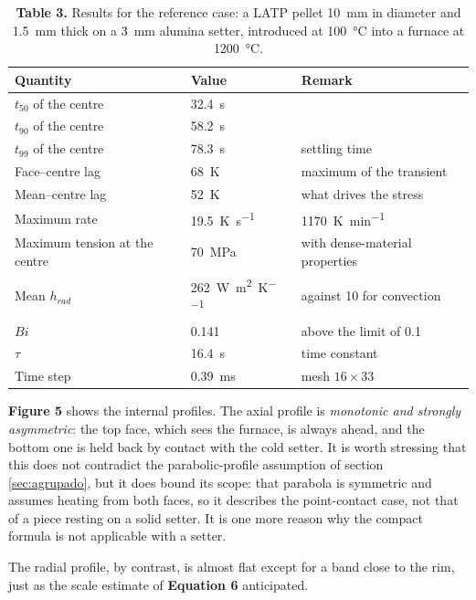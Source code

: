 \documentclass[11pt,a4paper]{article}
\newcommand{\fig}[1]{\textbf{\textcolor{uji}{Figure #1}}}
\newcommand{\ecu}[1]{\textbf{\textcolor{uji}{Equation #1}}}
\begin{document}
\begin{table}[htbp]
\centering
\caption*{\textcolor{uji}{\textbf{Table 3.}} Results for the reference
case: a LATP pellet \SI{10}{\milli\meter} in diameter and
\SI{1.5}{\milli\meter} thick on a \SI{3}{\milli\meter} alumina setter,
introduced at \SI{100}{\celsius} into a furnace at \SI{1200}{\celsius}.}
\begin{tabular}{lll}
\toprule
Quantity & Value & Remark \\
\midrule
$t_{50}$ of the centre & \SI{32.4}{\second} & \\
$t_{90}$ of the centre & \SI{58.2}{\second} & \\
$t_{99}$ of the centre & \SI{78.3}{\second} & settling time \\
Face--centre lag & \SI{68}{\kelvin} & maximum of the transient \\
Mean--centre lag & \SI{52}{\kelvin} & what drives the stress \\
Maximum rate & \SI{19.5}{\kelvin\per\second} & \SI{1170}{\kelvin\per\minute} \\
Maximum tension at the centre & \SI{70}{\mega\pascal} & with dense-material properties \\
Mean $h_{rad}$ & \SI{262}{\watt\per\meter\squared\per\kelvin} & against \SI{10}{} for convection \\
$Bi$ & \num{0.141} & above the limit of \num{0.1} \\
$\tau$ & \SI{16.4}{\second} & time constant \\
Time step & \SI{0.39}{\milli\second} & mesh $16 \times 33$ \\
\bottomrule
\end{tabular}
\end{table}

\fig{5} shows the internal profiles. The axial profile is \emph{monotonic
and strongly asymmetric}: the top face, which sees the furnace, is always
ahead, and the bottom one is held back by contact with the cold setter. It
is worth stressing that this does not contradict the parabolic-profile
assumption of section \ref{sec:agrupado}, but it does bound its scope: that
parabola is symmetric and assumes heating from both faces, so it describes
the point-contact case, not that of a piece resting on a solid setter. It
is one more reason why the compact formula is not applicable with a setter.

The radial profile, by contrast, is almost flat except for a band close to
the rim, just as the scale estimate of \ecu{6} anticipated.
\end{document}
